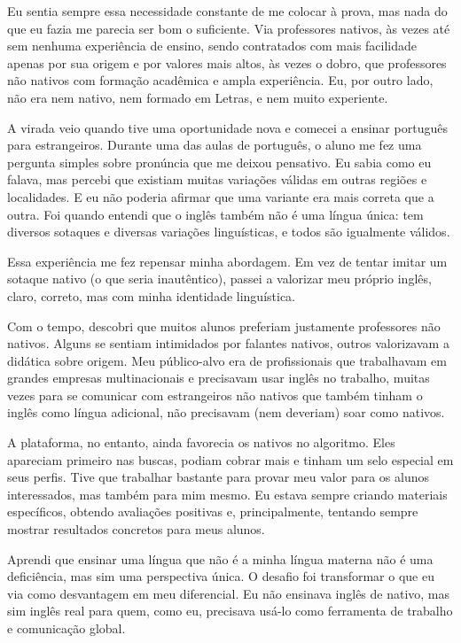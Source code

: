 \documentclass[portuguese]{textolivre}
\begin{document}
Eu sentia sempre essa necessidade constante de me colocar à prova, mas nada do que eu fazia me parecia ser bom o suficiente. Via professores nativos, às vezes até sem nenhuma experiência de ensino, sendo contratados com mais facilidade apenas por sua origem e por valores mais altos, às vezes o dobro, que professores não nativos com formação acadêmica e ampla experiência. Eu, por outro lado, não era nem nativo, nem formado em Letras, e nem muito experiente.

A virada veio quando tive uma oportunidade nova e comecei a ensinar português para estrangeiros. Durante uma das aulas de português, o aluno me fez uma pergunta simples sobre pronúncia que me deixou pensativo. Eu sabia como eu falava, mas percebi que existiam muitas variações válidas em outras regiões e localidades. E eu não poderia afirmar que uma variante era mais correta que a outra. Foi quando entendi que o inglês também não é uma língua única: tem diversos sotaques e diversas variações linguísticas, e todos são igualmente válidos.

Essa experiência me fez repensar minha abordagem. Em vez de tentar imitar um sotaque nativo (o que seria inautêntico), passei a valorizar meu próprio inglês, claro, correto, mas com minha identidade linguística.

Com o tempo, descobri que muitos alunos preferiam justamente professores não nativos. Alguns se sentiam intimidados por falantes nativos, outros valorizavam a didática sobre origem. Meu público-alvo era de profissionais que trabalhavam em grandes empresas multinacionais e precisavam usar inglês no trabalho, muitas vezes para se comunicar com estrangeiros não nativos que também tinham o inglês como língua adicional, não precisavam (nem deveriam) soar como nativos.

A plataforma, no entanto, ainda favorecia os nativos no algoritmo. Eles apareciam primeiro nas buscas, podiam cobrar mais e tinham um selo especial em seus perfis. Tive que trabalhar bastante para provar meu valor para os alunos interessados, mas também para mim mesmo. Eu estava sempre criando materiais específicos, obtendo avaliações positivas e, principalmente, tentando sempre mostrar resultados concretos para meus alunos.

Aprendi que ensinar uma língua que não é a minha língua materna não é uma deficiência, mas sim uma perspectiva única. O desafio foi transformar o que eu via como desvantagem em meu diferencial. Eu não ensinava inglês de nativo, mas sim inglês real para quem, como eu, precisava usá-lo como ferramenta de trabalho e comunicação global.
\end{document}
